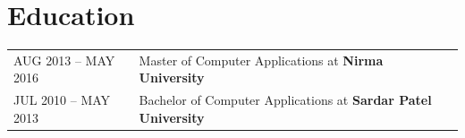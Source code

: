 \documentclass[a4paper,12pt]{article}
\begin{document}

\section{Education}
\begin{tabularx}{\linewidth}{@{}l X@{}}
AUG 2013 -- MAY 2016 & Master of Computer Applications at \textbf{Nirma University} \\[3pt]
JUL 2010 -- MAY 2013 & Bachelor of Computer Applications at \textbf{Sardar Patel University} \\
\end{tabularx}

\vfill
{}
\end{document}
